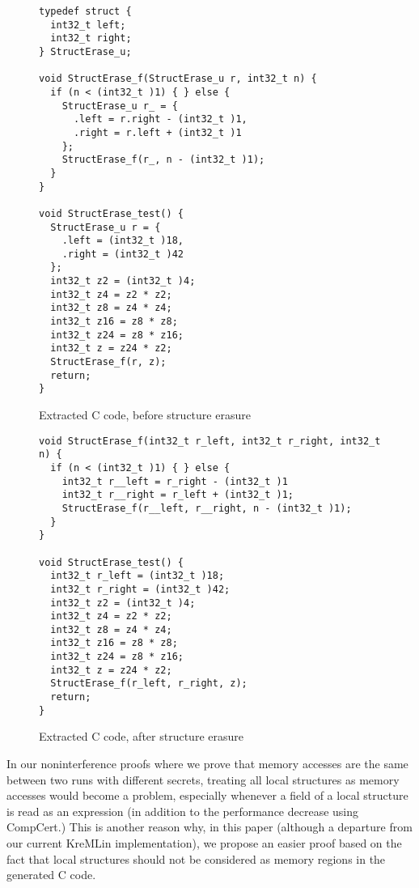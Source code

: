 \begin{figure}
\end{figure}

\begin{figure}
\begin{lstlisting}
typedef struct {
  int32_t left;
  int32_t right;
} StructErase_u;

void StructErase_f(StructErase_u r, int32_t n) {
  if (n < (int32_t )1) { } else {
    StructErase_u r_ = {
      .left = r.right - (int32_t )1,
      .right = r.left + (int32_t )1
    };
    StructErase_f(r_, n - (int32_t )1);
  }
}

void StructErase_test() {
  StructErase_u r = {
    .left = (int32_t )18,
    .right = (int32_t )42
  };
  int32_t z2 = (int32_t )4;
  int32_t z4 = z2 * z2;
  int32_t z8 = z4 * z4;
  int32_t z16 = z8 * z8;
  int32_t z24 = z8 * z16;
  int32_t z = z24 * z2;
  StructErase_f(r, z);
  return;
}
\end{lstlisting}
\caption{Extracted C code, before structure erasure}
\label{fig:struct-erase-before}
\end{figure}

\begin{figure}
\begin{lstlisting}
void StructErase_f(int32_t r_left, int32_t r_right, int32_t n) {
  if (n < (int32_t )1) { } else {
    int32_t r__left = r_right - (int32_t )1
    int32_t r__right = r_left + (int32_t )1;
    StructErase_f(r__left, r__right, n - (int32_t )1);
  }
}

void StructErase_test() {
  int32_t r_left = (int32_t )18;
  int32_t r_right = (int32_t )42;
  int32_t z2 = (int32_t )4;
  int32_t z4 = z2 * z2;
  int32_t z8 = z4 * z4;
  int32_t z16 = z8 * z8;
  int32_t z24 = z8 * z16;
  int32_t z = z24 * z2;
  StructErase_f(r_left, r_right, z);
  return;
}
\end{lstlisting}
\caption{Extracted C code, after structure erasure}
\label{fig:struct-erase-after}
\end{figure}

In our noninterference proofs where we prove that memory accesses are
the same between two runs with different secrets, treating all local
structures as memory accesses would become a problem, especially
whenever a field of a local structure is read as an expression (in
addition to the performance decrease using CompCert.)  This is another
reason why, in this paper (although a departure from our current
KreMLin implementation), we propose an easier proof based on the fact
that \cstar local structures should not be considered as memory regions in
the generated C code.

